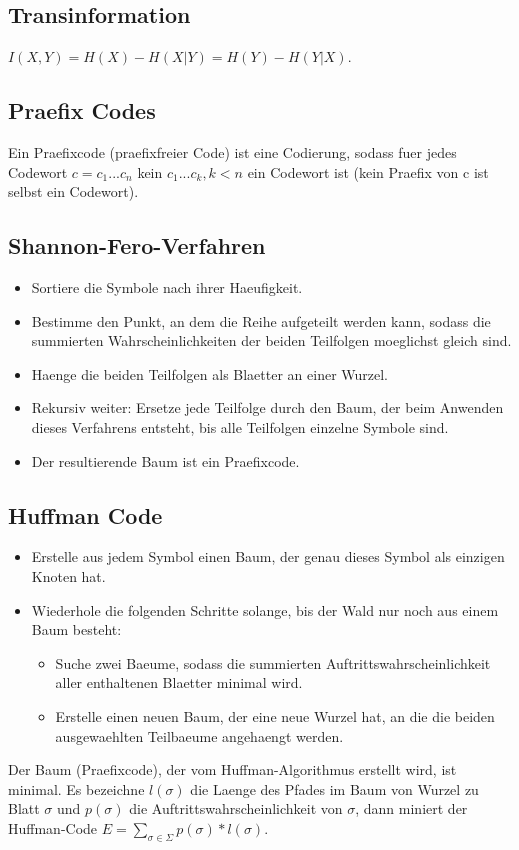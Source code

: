 \documentclass[a4paper]{scrreprt}
\begin{document}
\subsection{Transinformation}
$I(X,Y) = H(X) - H(X|Y) = H(Y) - H(Y|X)$.

\subsection{Praefix Codes}
Ein Praefixcode (praefixfreier Code) ist eine Codierung, sodass fuer jedes Codewort $c = c_1...c_n$ kein $c_1...c_k, k < n$ ein Codewort ist (kein Praefix von c ist selbst ein Codewort).

\subsection{Shannon-Fero-Verfahren}
\begin{itemize}
	\item Sortiere die Symbole nach ihrer Haeufigkeit.
	\item Bestimme den Punkt, an dem die Reihe aufgeteilt werden kann, sodass die summierten Wahrscheinlichkeiten der beiden Teilfolgen moeglichst gleich sind.
	\item Haenge die beiden Teilfolgen als Blaetter an einer Wurzel.
	\item Rekursiv weiter: Ersetze jede Teilfolge durch den Baum, der beim Anwenden dieses Verfahrens entsteht, bis alle Teilfolgen einzelne Symbole sind.
	\item Der resultierende Baum ist ein Praefixcode.
\end{itemize}

\subsection{Huffman Code}
\begin{itemize}
	\item Erstelle aus jedem Symbol einen Baum, der genau dieses Symbol als einzigen Knoten hat.
	\item Wiederhole die folgenden Schritte solange, bis der Wald nur noch aus einem Baum besteht:
		\begin{itemize}
			\item Suche zwei Baeume, sodass die summierten Auftrittswahrscheinlichkeit aller enthaltenen Blaetter minimal wird.
			\item Erstelle einen neuen Baum, der eine neue Wurzel hat, an die die beiden ausgewaehlten Teilbaeume angehaengt werden.
		\end{itemize}
\end{itemize}
Der Baum (Praefixcode), der vom Huffman-Algorithmus erstellt wird, ist minimal.
Es bezeichne $l(\sigma)$ die Laenge des Pfades im Baum von Wurzel zu Blatt $\sigma$ und $p(\sigma)$ die Auftrittswahrscheinlichkeit von $\sigma$, dann miniert der Huffman-Code $E = \sum_{\sigma \in \Sigma}p(\sigma)*l(\sigma)$.
\end{document}
